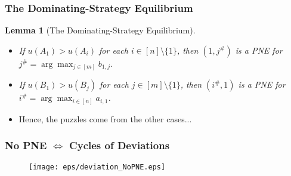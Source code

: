 \documentclass[xcolor=dvipsnames,envcountsect]{beamer}
\newtheorem*{lemm}{Lemma}
\begin{document}
\begin{frame}
	\frametitle{The Dominating-Strategy Equilibrium}
	\begin{lemm}[The Dominating-Strategy Equilibrium]
		\begin{itemize}
		\item If $u(A_1) > u(A_i)$ for each $i\in [n]\setminus\{1\}$, then $(1,j^{\#})$ is a PNE for $j^{\#} = \arg\max_{j\in [m]} b_{1,j}$. 
		\item If $u(B_1) > u(B_j)$ for each $j\in [m]\setminus \{1\}$, then $(i^{\#}, 1)$ is a PNE for $i^{\#} = \arg\max_{i\in [n]} a_{i,1}$. 
		\end{itemize}
	\end{lemm}
	\pause
\begin{itemize}
	\item Hence, the puzzles come from the other cases...
\end{itemize}
\end{frame}


\begin{frame}
\frametitle{No PNE $\Leftrightarrow$ Cycles of Deviations}
\begin{figure}
	\begin{center}
		\texttt{[image: eps/deviation\_NoPNE.eps]}
	\end{center}
\end{figure}
\end{frame}
\end{document}
